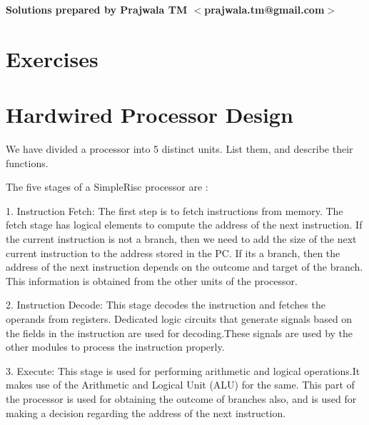 \begin{flushright}
\textbf{Solutions prepared by Prajwala TM $<$prajwala.tm@gmail.com$>$}
\end{flushright}
\section*{Exercises}
\vskip 1cm

\setcounter{Exercise}{0}
\setcounter{Answer}{0}

\section*{Hardwired Processor Design}

\begin{ExerciseList}

\Exercise
We have divided a \simplerisc processor into 5 distinct units. List them,
and describe their functions.

\Answer
The five stages of a SimpleRisc processor are :\newline

1. \hspace{4mm}Instruction Fetch:
The first step is to fetch instructions from memory. The fetch stage has logical elements to compute the address of the next instruction. If the current instruction is not a branch, then we need to add the size of the next current instruction to the address stored in the PC. If its a branch, then the address of the next instruction depends on the outcome and target of the branch. This information is obtained from the other units of the processor.\newline

2.\hspace{4mm} Instruction Decode:
This stage decodes the instruction and fetches the operands from registers. Dedicated logic circuits that generate signals based on the fields in the instruction are used for decoding.These signals are used by the other modules to process the instruction properly. \newline

3. \hspace{4mm}Execute:
This stage is used for performing arithmetic and logical operations.It makes use of the Arithmetic and Logical Unit (ALU) for the same. This part of the processor is used for obtaining the outcome of branches also, and is used for making a decision regarding the address of the next instruction.\newline


\end{ExerciseList}
